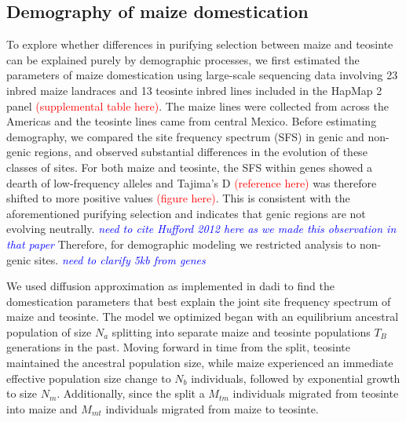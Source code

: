 \documentclass{pnastwo}
\newcommand{\jri}[1]{\textcolor{blue}{\emph{#1}} }
\begin{document}
\begin{article}
\subsection{Demography of maize domestication}
To explore whether differences in purifying selection between maize
and teosinte can be explained purely by demographic processes, we
first estimated the parameters of maize domestication using large-scale
sequencing data involving 23 inbred maize
landraces and 13 teosinte inbred lines included in the HapMap 2 panel
\cite{chia2012} \textcolor{red}{(supplemental table here)}. The maize
lines were collected from across the Americas and the teosinte lines
came from central Mexico. Before estimating demography, we compared
the site frequency spectrum (SFS) in genic and non-genic regions, and
observed substantial differences in the evolution of these classes of
sites. For both maize and teosinte, the SFS within genes showed a
dearth of low-frequency alleles and Tajima's D
\textcolor{red}{(reference here)} was therefore shifted
to more positive values \textcolor{red}{(figure here)}. This is consistent with the aforementioned purifying
selection and indicates that genic regions are not evolving
neutrally. \jri{need to cite Hufford 2012 here as we made this observation in that paper} Therefore, for demographic modeling we restricted analysis
to non-genic sites. \jri{need to clarify 5kb from genes}

We used diffusion approximation as implemented in
dadi \cite{gutenkunst2009} to find the domestication parameters that best explain
the joint site frequency spectrum of maize and teosinte.  The model we optimized began with an
equilibrium ancestral population of size $N_a$
splitting into separate maize and teosinte populations $T_B$ generations in the past. Moving forward in
time from the split, teosinte maintained the ancestral population size, while
maize experienced an immediate effective population size change to
$N_b$ individuals, followed by exponential growth to size
$N_m$. Additionally, since the split a $M_{tm}$ individuals migrated
from teosinte into maize and $M_{mt}$ individuals migrated from maize
to teosinte.


\end{article}
\end{document}
